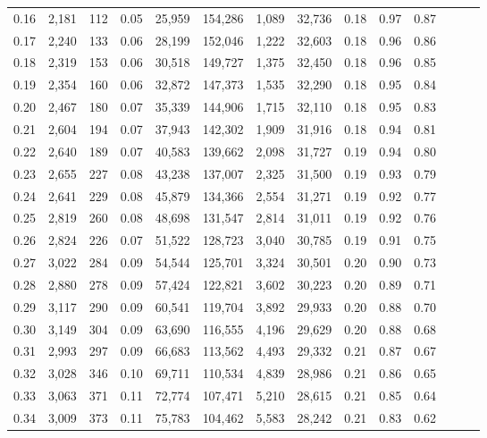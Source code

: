 \begin{tabular}{rrrrrrrrrrrrrr}
0.16 &  2,181 &  112 &  0.05 &   25,959 &  154,286 &   1,089 &  32,736 &  0.18 &  0.97 &      0.87 \\
0.17 &  2,240 &  133 &  0.06 &   28,199 &  152,046 &   1,222 &  32,603 &  0.18 &  0.96 &      0.86 \\
0.18 &  2,319 &  153 &  0.06 &   30,518 &  149,727 &   1,375 &  32,450 &  0.18 &  0.96 &      0.85 \\
0.19 &  2,354 &  160 &  0.06 &   32,872 &  147,373 &   1,535 &  32,290 &  0.18 &  0.95 &      0.84 \\
0.20 &  2,467 &  180 &  0.07 &   35,339 &  144,906 &   1,715 &  32,110 &  0.18 &  0.95 &      0.83 \\
0.21 &  2,604 &  194 &  0.07 &   37,943 &  142,302 &   1,909 &  31,916 &  0.18 &  0.94 &      0.81 \\
0.22 &  2,640 &  189 &  0.07 &   40,583 &  139,662 &   2,098 &  31,727 &  0.19 &  0.94 &      0.80 \\
0.23 &  2,655 &  227 &  0.08 &   43,238 &  137,007 &   2,325 &  31,500 &  0.19 &  0.93 &      0.79 \\
0.24 &  2,641 &  229 &  0.08 &   45,879 &  134,366 &   2,554 &  31,271 &  0.19 &  0.92 &      0.77 \\
0.25 &  2,819 &  260 &  0.08 &   48,698 &  131,547 &   2,814 &  31,011 &  0.19 &  0.92 &      0.76 \\
0.26 &  2,824 &  226 &  0.07 &   51,522 &  128,723 &   3,040 &  30,785 &  0.19 &  0.91 &      0.75 \\
0.27 &  3,022 &  284 &  0.09 &   54,544 &  125,701 &   3,324 &  30,501 &  0.20 &  0.90 &      0.73 \\
0.28 &  2,880 &  278 &  0.09 &   57,424 &  122,821 &   3,602 &  30,223 &  0.20 &  0.89 &      0.71 \\
0.29 &  3,117 &  290 &  0.09 &   60,541 &  119,704 &   3,892 &  29,933 &  0.20 &  0.88 &      0.70 \\
0.30 &  3,149 &  304 &  0.09 &   63,690 &  116,555 &   4,196 &  29,629 &  0.20 &  0.88 &      0.68 \\
0.31 &  2,993 &  297 &  0.09 &   66,683 &  113,562 &   4,493 &  29,332 &  0.21 &  0.87 &      0.67 \\
0.32 &  3,028 &  346 &  0.10 &   69,711 &  110,534 &   4,839 &  28,986 &  0.21 &  0.86 &      0.65 \\
0.33 &  3,063 &  371 &  0.11 &   72,774 &  107,471 &   5,210 &  28,615 &  0.21 &  0.85 &      0.64 \\
0.34 &  3,009 &  373 &  0.11 &   75,783 &  104,462 &   5,583 &  28,242 &  0.21 &  0.83 &      0.62 \\

\end{tabular}
